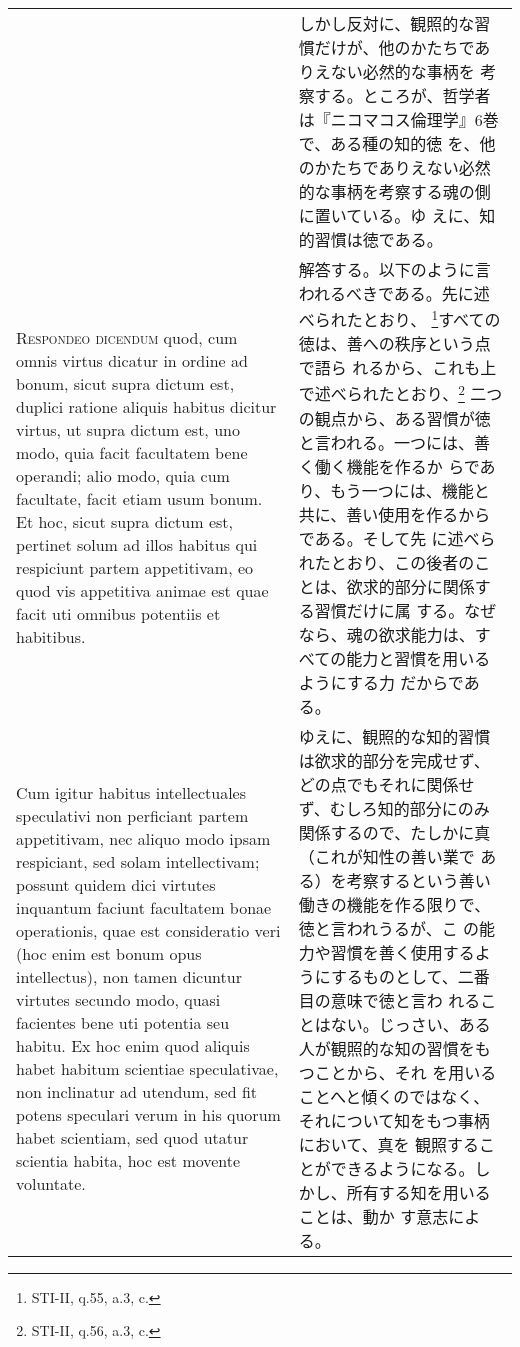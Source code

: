 \documentclass[10pt]{jsarticle}
\begin{document}
\begin{longtable}{p{21em}p{21em}}
&

しかし反対に、観照的な習慣だけが、他のかたちでありえない必然的な事柄を
考察する。ところが、哲学者は『ニコマコス倫理学』6巻で、ある種の知的徳
を、他のかたちでありえない必然的な事柄を考察する魂の側に置いている。ゆ
えに、知的習慣は徳である。

\\

{\scshape Respondeo dicendum} quod, cum omnis virtus dicatur in ordine
ad bonum, sicut supra dictum est, duplici ratione aliquis habitus
dicitur virtus, ut supra dictum est, uno modo, quia facit facultatem
bene operandi; alio modo, quia cum facultate, facit etiam usum
bonum. Et hoc, sicut supra dictum est, pertinet solum ad illos habitus
qui respiciunt partem appetitivam, eo quod vis appetitiva animae est
quae facit uti omnibus potentiis et habitibus.

&

解答する。以下のように言われるべきである。先に述べられたとおり、
\footnote{STI-II, q.55, a.3, c.}すべての徳は、善への秩序という点で語ら
れるから、これも上で述べられたとおり、\footnote{STI-II, q.56, a.3, c.}
二つの観点から、ある習慣が徳と言われる。一つには、善く働く機能を作るか
らであり、もう一つには、機能と共に、善い使用を作るからである。そして先
に述べられたとおり、この後者のことは、欲求的部分に関係する習慣だけに属
する。なぜなら、魂の欲求能力は、すべての能力と習慣を用いるようにする力
だからである。

\\

Cum igitur habitus intellectuales speculativi non perficiant partem
appetitivam, nec aliquo modo ipsam respiciant, sed solam
intellectivam; possunt quidem dici virtutes inquantum faciunt
facultatem bonae operationis, quae est consideratio veri (hoc enim est
bonum opus intellectus), non tamen dicuntur virtutes secundo modo,
quasi facientes bene uti potentia seu habitu. Ex hoc enim quod aliquis
habet habitum scientiae speculativae, non inclinatur ad utendum, sed
fit potens speculari verum in his quorum habet scientiam, sed quod
utatur scientia habita, hoc est movente voluntate.

&

ゆえに、観照的な知的習慣は欲求的部分を完成せず、どの点でもそれに関係せ
ず、むしろ知的部分にのみ関係するので、たしかに真（これが知性の善い業で
ある）を考察するという善い働きの機能を作る限りで、徳と言われうるが、こ
の能力や習慣を善く使用するようにするものとして、二番目の意味で徳と言わ
れることはない。じっさい、ある人が観照的な知の習慣をもつことから、それ
を用いることへと傾くのではなく、それについて知をもつ事柄において、真を
観照することができるようになる。しかし、所有する知を用いることは、動か
す意志による。


\end{longtable}
\end{document}

